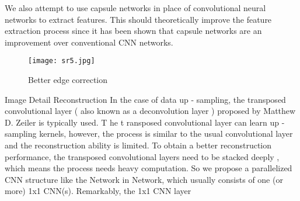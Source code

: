 We also attempt to use capsule networks in place of convolutional neural networks to extract features. This should theoretically improve the feature extraction process since it has been shown that capsule networks are an improvement over conventional CNN networks.

\begin{figure}[htb]
    \centering
    \texttt{[image: sr5.jpg]}
    \caption{Better edge correction}
    \label{fig:sr5} %
\end{figure}

Image Detail Reconstruction
In the case of data up - sampling, the transposed convolutional layer ( also known as a deconvolution layer ) proposed by Matthew D. Zeiler is typically used. T he t ransposed convolutional layer can learn up - sampling kernels, however, the process is similar to the usual convolutional layer and the reconstruction ability is limited. To obtain a better reconstruction performance, the transposed convolutional layers need to be stacked deeply , which means the process needs heavy computation. So we propose a parallelized CNN structure like the Network in Network, which usually consists of one (or more) 1x1 CNN(s). Remarkably, the 1x1 CNN layer 
